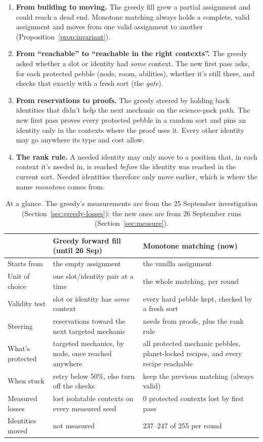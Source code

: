 \begin{enumerate}[leftmargin=*]
  \item \textbf{From building to moving.} The greedy fill grew a partial assignment and could reach a dead end. Monotone matching always holds a complete, valid assignment and moves from one valid assignment to another (Proposition~\ref{prop:invariant}).
  \item \textbf{From ``reachable'' to ``reachable in the right contexts''.} The greedy asked whether a slot or identity had \emph{some} context. The new first pass asks, for each protected pebble (node, room, abilities), whether it's still there, and checks that exactly with a fresh sort (the \emph{gate}).
  \item \textbf{From reservations to proofs.} The greedy steered by holding back identities that didn't help the next mechanic on the science-pack path. The new first pass proves every protected pebble in a random sort and pins an identity only in the contexts where the proof uses it. Every other identity may go anywhere its type and cost allow.
  \item \textbf{The rank rule.} A needed identity may only move to a position that, in each context it's needed in, is reached \emph{before} the identity was reached in the current sort. Needed identities therefore only move earlier, which is where the name \emph{monotone} comes from.
\end{enumerate}

\begin{table}[H]
\centering\small
\begin{tabularx}{\textwidth}{@{}p{3.2cm}LL@{}}
\toprule
& \textbf{Greedy forward fill (until 26 Sep)} & \textbf{Monotone matching (now)}\\
\midrule
Starts from & the empty assignment & the vanilla assignment\\
Unit of choice & one slot/identity pair at a time & the whole matching, per round\\
Validity test & slot or identity has \emph{some} context & every hard pebble kept, checked by a fresh sort\\
Steering & reservations toward the next targeted mechanic & needs from proofs, plus the rank rule\\
What's protected & targeted mechanics, by node, once reached anywhere & all protected mechanic pebbles, planet-locked recipes, and every recipe reachable\\
When stuck & retry below 50\%, else turn off the checks & keep the previous matching (always valid)\\
Measured losses & lost isolatable contexts on every measured seed & 0 protected contexts lost by first pass\\
Identities moved & not measured & 237--247 of 255 per round\\
\bottomrule
\end{tabularx}
\caption{At a glance. The greedy's measurements are from the 25 September investigation (Section~\ref{sec:greedy-losses}); the new ones are from 26 September runs (Section~\ref{sec:measure}).}
\label{tab:glance}
\end{table}
